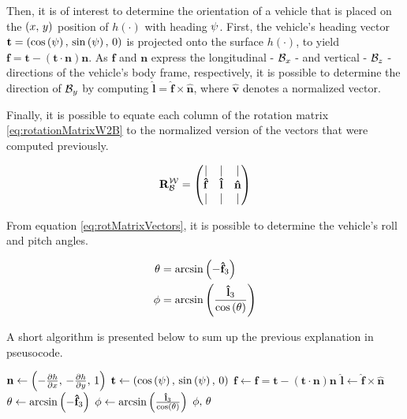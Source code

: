 Then, it is of interest to determine the orientation of a vehicle that is placed on the $\left(x,\,y\right)$ position of $h\left(\cdot\right)$ with heading $\psi$. First, the vehicle's heading vector $\mathbf{t} = \left(\cos\left(\psi\right),\,\sin\left(\psi\right),\,0\right)$ is projected onto the surface $h\left(\cdot\right)$, to yield $\mathbf{f} = \mathbf{t} - \left(\mathbf{t}\cdot\mathbf{n}\right)\mathbf{n}$. As $\mathbf{f}$ and $\mathbf{n}$ express the longitudinal - $\mathcal{B}_x$ - and vertical - $\mathcal{B}_z$ - directions of the vehicle's body frame, respectively, it is possible to determine the direction of $\mathcal{B}_y$ by computing $\mathbf{\hat{l}} = \mathbf{\hat{f}} \times \mathbf{\hat{n}} $, where $\mathbf{\hat{v}}$ denotes a normalized vector.

Finally, it is possible to equate each column of the rotation matrix \ref{eq:rotationMatrixW2B} to the normalized version of the vectors that were computed previously.

\begin{equation}
\mathbf{R}_{\mathcal{B}}^{\mathcal{W}} = \begin{pmatrix}
	\vert & \vert & \vert \\
    \mathbf{\hat{f}}   & \mathbf{\hat{l}} & \mathbf{\hat{n}} \\
    \vert & \vert & \vert
\end{pmatrix}
\label{eq:rotMatrixVectors}
\end{equation}

From equation \ref{eq:rotMatrixVectors}, it is possible to determine the vehicle's roll and pitch angles.

\begin{align}
\theta &= \arcsin\left(-\mathbf{\hat{f}}_3\right)\\
\phi &= \arcsin\left(\frac{ \mathbf{\hat{l}}_3}{\cos\left(\theta\right)}  \right)
\end{align}

A short algorithm is presented below to sum up the previous explanation in pseusocode.

\begin{algorithm}[H]
	\caption{\footnotesize \textsc{GETEULERANGLES}}\label{alg:determineeulerangles}
	\centering
	\footnotesize
	\begin{algorithmic}[1]
	\State $\mathbf{n} \gets \left(-\pdv{h}{x},\, -\pdv{h}{y},\,1\right)$
	\State $\mathbf{t} \gets \left(\cos\left(\psi\right),\,\sin\left(\psi\right),\,0\right)$
	\State $\mathbf{f} \gets \mathbf{f} = \mathbf{t} - \left(\mathbf{t}\cdot\mathbf{n}\right)\mathbf{n}$
	\State $\mathbf{\hat{l}} \gets \mathbf{\hat{f}} \times \mathbf{\hat{n}}$
	\State $\theta \gets \arcsin\left(-\mathbf{\hat{f}}_3\right)$
	\State $\phi \gets \arcsin\left(\frac{\mathbf{\hat{l}}_3}{\cos\left(\theta\right)}\right)$
	\State \Return $\phi,\,\theta$
	\EndFunction
	\end{algorithmic}
\end{algorithm}

